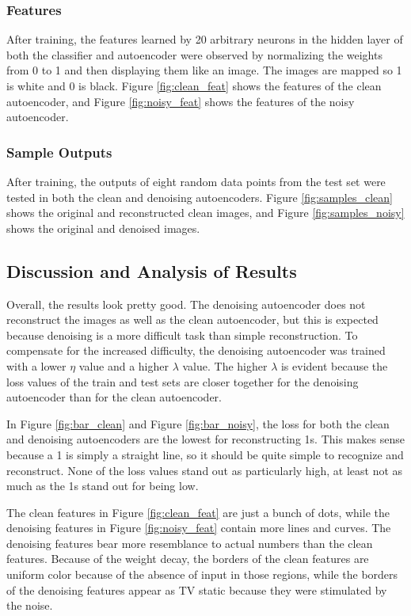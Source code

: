 \documentclass[a4paper, 12pt, titlepage]{article}
\newcommand{\figRef}[1]{Figure \ref{#1}}
\begin{document}
  \subsubsection{Features}
  \par After training, the features learned by 20 arbitrary neurons in the
  hidden layer of both the classifier and autoencoder were observed by
  normalizing the weights from 0 to 1 and then displaying them like an image.
  The images are mapped so 1 is white and 0 is black.
  \figRef{fig:clean_feat} shows the features of the clean autoencoder, and
  \figRef{fig:noisy_feat} shows the features of the noisy autoencoder.

  \subsubsection{Sample Outputs}
  \par After training, the outputs of eight random data points from the test
  set were tested in both the clean and denoising autoencoders.
  \figRef{fig:samples_clean} shows the original and reconstructed clean images,
  and \figRef{fig:samples_noisy} shows the original and denoised images.

  \subsection{Discussion and Analysis of Results}
  \par Overall, the results look pretty good.
  The denoising autoencoder does not reconstruct the images as well as the
  clean autoencoder, but this is expected because denoising is a more difficult
  task than simple reconstruction.
  To compensate for the increased difficulty, the denoising autoencoder was
  trained with a lower $\eta$ value and a higher $\lambda$ value.
  The higher $\lambda$ is evident because the loss values of the train and test
  sets are closer together for the denoising autoencoder than for the clean
  autoencoder.
  \par In \figRef{fig:bar_clean} and \figRef{fig:bar_noisy}, the loss for both
  the clean and denoising autoencoders are the lowest for reconstructing 1s.
  This makes sense because a 1 is simply a straight line, so it should be quite
  simple to recognize and reconstruct.
  None of the loss values stand out as particularly high, at least not as much
  as the 1s stand out for being low.
  \par The clean features in \figRef{fig:clean_feat} are just a bunch of dots,
  while the denoising features in \figRef{fig:noisy_feat} contain more lines
  and curves.
  The denoising features bear more resemblance to actual numbers than the clean
  features.
  Because of the weight decay, the borders of the clean features are uniform
  color because of the absence of input in those regions, while the borders
  of the denoising features appear as TV static because they were stimulated
  by the noise.
\end{document}
